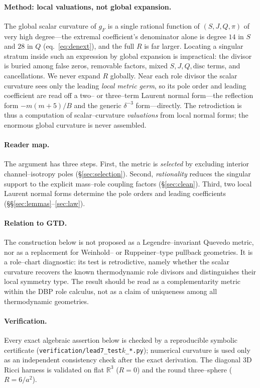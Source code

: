 \documentclass[11pt]{article}
\begin{document}
\paragraph{Method: local valuations, not global expansion.}
The global scalar curvature of $g_F$ is a single rational function of $(S,J,Q,\pi)$ of very high
degree---the extremal coefficient's denominator alone is degree $14$ in $S$ and $28$ in $Q$
(eq.~\eqref{eq:denext}), and the full $R$ is far larger. Locating a singular stratum inside such
an expression by global expansion is impractical: the divisor is buried among false zeros,
removable factors, mixed $S,J,Q,\mathrm{disc}$ terms, and cancellations. We never expand $R$
globally. Near each role divisor the scalar curvature sees only the leading \emph{local metric
germ}, so its pole order and leading coefficient are read off a two-- or three--term Laurent
normal form---the reflection form $-m(m+5)/B$ and the generic $\delta^{-3}$ form---directly. The
retrodiction is thus a computation of scalar--curvature \emph{valuations} from local normal
forms; the enormous global curvature is never assembled.

\paragraph{Reader map.}
The argument has three steps. First, the metric is \emph{selected} by excluding interior
channel--isotropy poles (\S\ref{sec:selection}). Second, \emph{rationality} reduces the
singular support to the explicit mass--role coupling factors (\S\ref{sec:clean}). Third, two
local Laurent normal forms determine the pole orders and leading coefficients
(\S\S\ref{sec:lemmas}--\ref{sec:law}).

\paragraph{Relation to GTD.}
The construction below is not proposed as a Legendre--invariant Quevedo metric, nor as a
replacement for Weinhold-- or Ruppeiner--type pullback geometries. It is a role--chart
diagnostic: its test is retrodictive, namely whether the scalar curvature recovers the known
thermodynamic role divisors and distinguishes their local symmetry type. The result should be
read as a complementarity metric within the DBP role calculus, not as a claim of uniqueness
among all thermodynamic geometries.

\paragraph{Verification.}
Every exact algebraic assertion below is checked by a reproducible symbolic certificate
(\texttt{verification/lead7\_test$k$\_*.py}); numerical curvature is used only as an
independent consistency check after the exact derivation. The diagonal $3$D Ricci harness is
validated on flat $\mathbb R^3$ ($R=0$) and the round three--sphere ($R=6/a^2$).
\end{document}
